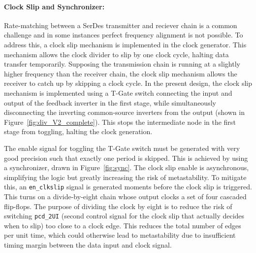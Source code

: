 \paragraph{Clock Slip and Synchronizer:}
Rate-matching between a SerDes transmitter and reciever chain is a common challenge and in some instances perfect frequency alignment is not possible. To address this, a clock slip mechanism is implemented in the clock generator. This mechanism allows the clock divider to slip by one clock cycle, halting data transfer temporarily.
Supposing the transmission chain is running at a slightly higher frequency than the receiver chain, the clock slip mechanism allows the receiver to catch up by skipping a clock cycle. 
In the present design, the clock slip mechanism is implemented using a T-Gate switch connecting the input and output of the feedback inverter in the first stage, while simultaneously disconnecting the inverting common-source inverters from the output (shown in Figure~\ref{fig:div_V2_complete}). This stops the intermediate node in the first stage from toggling, halting the clock generation.

The enable signal for toggling the T-Gate switch must be generated with very good precision such that exactly one period is skipped. This is achieved by using a synchronizer, drawn in Figure~\ref{fig:sync}.
The clock slip enable is asynchronous, simplifying the logic but greatly increasing the risk of metastability. 
To mitigate this, an \texttt{en\_clkslip} signal is generated moments before the clock slip is triggered. This turns on a divide-by-eight chain whose output clocks a set of four cascaded flip-flops. 
The purpose of dividing the clock by eight is to reduce the risk of switching \texttt{pcd\_2UI} (second control signal for the clock slip that actually decides when to slip) too close to a clock edge. This reduces the total number of edges per unit time, which could otherwise lead to metastability due to insufficient timing margin between the data input and clock signal. 

